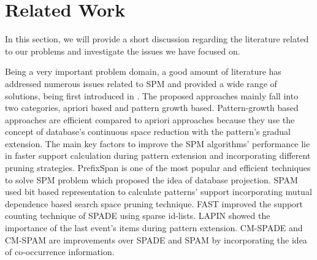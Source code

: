 \section{Related Work} \label{related_works}
In this section, we will provide a short discussion regarding the literature related to our problems and investigate the issues we have focused on.

Being a very important problem domain, a good amount of literature has addressed numerous issues related to SPM \cite{fournier2017survey,gan2019survey} and provided a wide range of solutions, being first introduced in \cite{srikant1996mining}. The proposed approaches mainly fall into two categories, apriori based and pattern growth based. Pattern-growth based approaches are efficient compared to apriori approaches because they use the concept of database's continuous space reduction with the pattern's gradual extension. The main key factors to improve the SPM algorithms' performance lie in faster support calculation during pattern extension and incorporating different pruning strategies\cite{fournier2014fast,han2001prefixspan,zaki2001spade,rizvee2020tree}. PrefixSpan \cite{han2001prefixspan} is one of the most popular and efficient techniques to solve SPM problem which proposed the idea of database projection. SPAM\cite{Spam} used bit based representation to calculate patterns' support incorporating mutual dependence based search space pruning technique. FAST\cite{Fast} improved the support counting technique of SPADE\cite{zaki2001spade} using sparse id-lists. LAPIN\cite{Lapin} showed the importance of the last event's items during pattern extension. CM-SPADE and CM-SPAM\cite{fournier2014fast} are improvements over SPADE and SPAM by incorporating the idea of co-occurrence information.

